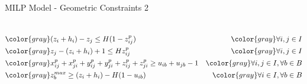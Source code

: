 \documentclass{beamer}
\begin{document}
\begin{frame}{MILP Model - Geometric Constraints 2}
\begin{columns}[onlytextwidth,T]
{\begin{minipage}{\linewidth}
\begin{align}
                                         & \color{gray} (z_i + h_i) - z_j\le H(1 - z^p_{ij})                                                     & \color{gray} \forall i,j \in I \notag \\
                                         & \color{gray} z_j - (z_i + h_i) + 1 \le H z^p_{ij}                                                     & \color{gray} \forall i,j \in I \notag \\
                                         & \color{gray} x^p_{ij} + x^p_{ji} + y^p_{ij} + y^p_{ji} + z^p_{ij} + z^p_{ji} \ge u_{ib} + u_{jb} - 1  & \color{gray} \forall i,j \in I, \forall b \in B \notag \\
                                         & \color{gray} z^{max}_b \ge (z_i + h_i) - H(1-u_{ib})                                                  & \color{gray} \forall i \in I, \forall b \in B \notag
                    \end{align}
                \end{minipage}
            }
            \end{columns}
    \end{frame}
\end{document}
